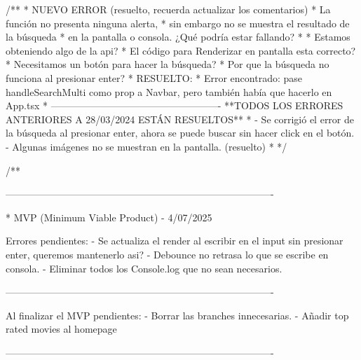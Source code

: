 
/** 
 * NUEVO ERROR (resuelto, recuerda actualizar los comentarios)
 * La función no presenta ninguna alerta, 
 * sin embargo no se muestra el resultado de la búsqueda 
 * en la pantalla o consola. ¿Qué podría estar fallando? 
 * 
 * Estamos obteniendo algo de la api?
 * El código para Renderizar en pantalla esta correcto?
 * Necesitamos un botón para hacer la búsqueda?
 * Por que la búsqueda no funciona al presionar enter?
 * RESUELTO:
 *  Error encontrado: pase handleSearchMulti como prop a Navbar, pero también había que hacerlo en App.tsx
 * ----------------------------------------------------
 **TODOS LOS ERRORES ANTERIORES A 28/03/2024 ESTÁN RESUELTOS**
 * - Se corrigió el error de la búsqueda al presionar enter, ahora se puede buscar sin hacer click en el botón.
   - Algunas imágenes no se muestran en la pantalla. (resuelto)
 * */

/**

 ----------------------------------------------------------------------------------

    * MVP (Minimum Viable Product) - 4/07/2025

 Errores pendientes:
 - Se actualiza el render al escribir en el input sin presionar enter, queremos mantenerlo asi? 
 - Debounce no retrasa lo que se escribe en consola.
 - Eliminar todos los Console.log que no sean necesarios.
 
 
 ----------------------------------------------------------------------------------

 Al finalizar el MVP pendientes:
 - Borrar las branches innecesarias.
 - Añadir top rated movies al homepage
 
 ----------------------------------------------------------------------------------